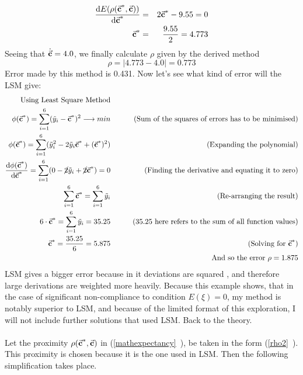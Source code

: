 \begin{eqnarray*}
\frac{\mathrm{d}E(\rho(\vec{\textbf{c}}^{*},\vec{\textbf{c}}))}{\mathrm{d}\vec{\textbf{c}}^{*}} &=& 2\vec{\textbf{c}}^{*}-9.55 = 0 \\
\vec{\textbf{c}}^{*} &=& \frac{9.55}{2} = 4.773
\end{eqnarray*}
Seeing that $\dot{\vec{\textbf{c}}} = 4.0$, we finally calculate $\rho$ given by the derived method
\begin{equation*}
\rho = |4.773-4.0| = 0.773
\end{equation*}
Error made by this method is 0.431. Now let's see what kind of error will the LSM give:
\begin{eqnarray*}
\text{Using Least Square Method} \\
\phi(\vec{\textbf{c}}^{*})= \sum\limits_{i=1}^{6}(\tilde{y}_{i}-\vec{\textbf{c}}^{*})^{2} \longrightarrow min &\qquad & \text{(Sum of the squares of errors has to be minimised)}\\
\phi(\vec{\textbf{c}}^{*})= \sum\limits_{i=1}^{6}(\tilde{y}_{i}^{2}-2 \tilde{y}_{i}\vec{\textbf{c}}^{*} + (\vec{\textbf{c}}^{*})^{2}) &\qquad & \text{(Expanding the polynomial)}\\
\frac{\mathrm{d}\phi(\vec{\textbf{c}}^{*})}{\mathrm{d}\vec{\textbf{c}}^{*}} =  \sum\limits_{i=1}^{6}(0 -\cancel{2} \tilde{y}_{i} +\cancel{2} \vec{\textbf{c}}^{*}) = 0  &\qquad & \text{(Finding the derivative and equating it to zero)}\\
 \sum\limits_{i=1}^{6}\vec{\textbf{c}}^{*} = \sum\limits_{i=1}^{6} \tilde{y}_{i} &\qquad & \text{(Re-arranging the result)}\\
 6 \cdot \vec{\textbf{c}}^{*} = \sum\limits_{i=1}^{6} \tilde{y}_{i} = 35.25 &\qquad & \text{(35.25 here refers to the sum of all function values)}\\
 \vec{\textbf{c}}^{*} = \frac{35.25}{6} = 5.875 &\qquad & \text{(Solving for $\vec{\textbf{c}}^{*}$)}\\
& \qquad & \text{And so the error } \rho = 1.875
\end{eqnarray*}
LSM gives a bigger error because in it deviations are squared  \cite{Plackett_1950}, and therefore large derivations are weighted more heavily. Because this example shows, that in the case of significant non-compliance to condition $E(\xi)=0$, my method is notably superior to LSM, and because of the limited format of this exploration, I will not include further solutions that used LSM. %
 Back to the theory.\\
\\
Let the proximity $\rho(\vec{\textbf{c}}^{*},\vec{\textbf{c}})$ in (\vref{mathexpectancy}~), be taken in the form (\vref{rho2}~). This proximity is chosen because it is the one used in LSM. Then the following simplification takes place.
